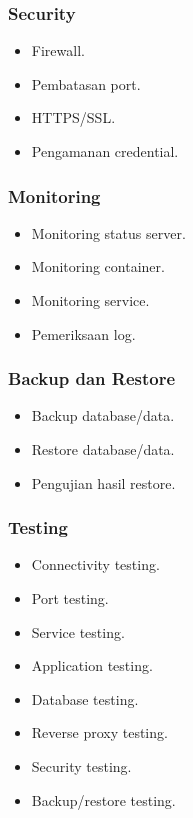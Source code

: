 \documentclass[
]{article}
\providecommand{\tightlist}{%
  \setlength{\itemsep}{0pt}\setlength{\parskip}{0pt}}
\begin{document}
\subsubsection{Security}\label{security}

\begin{itemize}
\tightlist
\item
  Firewall.
\item
  Pembatasan port.
\item
  HTTPS/SSL.
\item
  Pengamanan credential.
\end{itemize}

\subsubsection{Monitoring}\label{monitoring}

\begin{itemize}
\tightlist
\item
  Monitoring status server.
\item
  Monitoring container.
\item
  Monitoring service.
\item
  Pemeriksaan log.
\end{itemize}

\subsubsection{Backup dan Restore}\label{backup-dan-restore}

\begin{itemize}
\tightlist
\item
  Backup database/data.
\item
  Restore database/data.
\item
  Pengujian hasil restore.
\end{itemize}

\subsubsection{Testing}\label{testing}

\begin{itemize}
\tightlist
\item
  Connectivity testing.
\item
  Port testing.
\item
  Service testing.
\item
  Application testing.
\item
  Database testing.
\item
  Reverse proxy testing.
\item
  Security testing.
\item
  Backup/restore testing.
\end{itemize}
\end{document}
